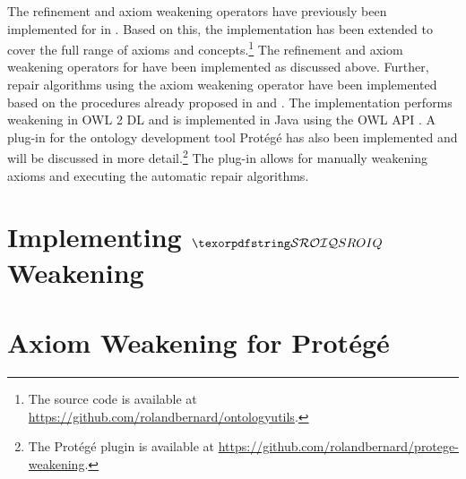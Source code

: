 
The refinement and axiom weakening operators have previously been implemented for \ALC in \cite{troquard2018repairing}. Based on this, the implementation has been extended to cover the full range of \SROIQ axioms and concepts.\footnote{The source code is available at \url{https://github.com/rolandbernard/ontologyutils}.} The refinement and axiom weakening operators for \SROIQ have been implemented as discussed above. Further, repair algorithms using the axiom weakening operator have been implemented based on the procedures already proposed in \cite{troquard2018repairing} and \cite{confalonieri2020towards}. The implementation performs weakening in OWL 2 DL \cite{motik2012ontology} and is implemented in Java using the OWL API \cite{horridge2011owl,owlapi,matentzoglu2016introduction}. A plug-in for the ontology development tool Protégé has also been implemented and will be discussed in more detail.\footnote{The Protégé plugin is available at \url{https://github.com/rolandbernard/protege-weakening}.} The plug-in allows for manually weakening axioms and executing the automatic repair algorithms.

\section{Implementing \texorpdfstring{$\SROIQ$}{SROIQ} Weakening}\label{prototype}



\section{Axiom Weakening for Protégé}\label{protege}


